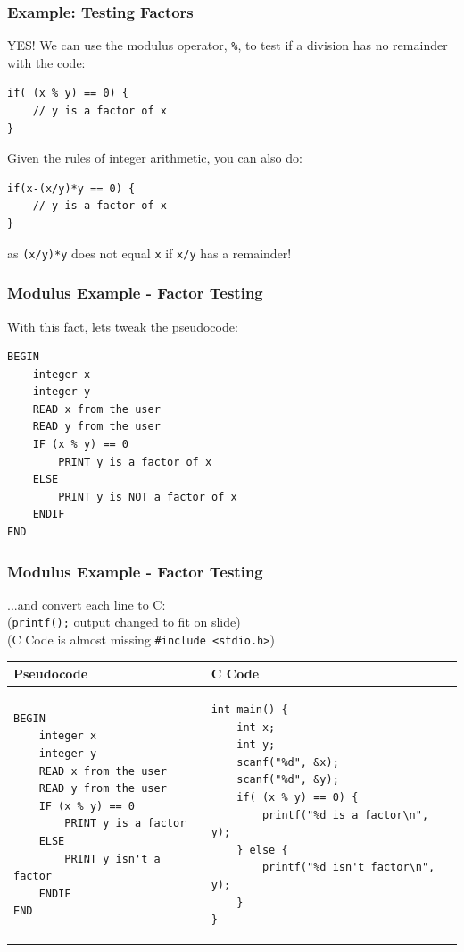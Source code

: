 \documentclass[14pt]{beamer}
\begin{document}
\begin{frame}[fragile]
\frametitle{Example: Testing Factors}
YES! We can use the modulus operator, \texttt{\%}, to test if a division has no remainder with the code:

\begin{lstlisting}[style=CStyle]
if( (x % y) == 0) {
	// y is a factor of x
}
\end{lstlisting}

Given the rules of integer arithmetic, you can also do:

\begin{lstlisting}[style=CStyle]
if(x-(x/y)*y == 0) {
	// y is a factor of x
}
\end{lstlisting}

as \texttt{(x/y)*y} does not equal \texttt{x} if \texttt{x/y} has a remainder!

\end{frame}

\begin{frame}[fragile]
\frametitle{Modulus Example - Factor Testing}
With this fact, lets tweak the pseudocode:
\begin{lstlisting}[style=pseudo]
BEGIN
	integer x
	integer y
	READ x from the user
	READ y from the user
	IF (x % y) == 0
		PRINT y is a factor of x
	ELSE
		PRINT y is NOT a factor of x
	ENDIF
END
\end{lstlisting}
\end{frame}

\begin{frame}[fragile]
\frametitle{Modulus Example - Factor Testing}
...and convert each line to C:\\
\vspace{4mm}
\small{(\texttt{printf();} output changed to fit on slide)}\\
\small{(C Code is almost missing \texttt{\#include <stdio.h>})}
\vspace{-2mm}
\begin{table}[H]
\centering

\begin{tabular}{ll}
Pseudocode & C Code \\
\hline

\begin{lstlisting}[style=pseudo,basicstyle=\ttfamily\scriptsize]
BEGIN
	integer x
	integer y
	READ x from the user
	READ y from the user
	IF (x % y) == 0
		PRINT y is a factor
	ELSE
		PRINT y isn't a factor
	ENDIF
END
\end{lstlisting} &

\begin{lstlisting}[style=Ctable,basicstyle=\ttfamily\scriptsize]
int main() {
	int x;
	int y;
	scanf("%d", &x);
	scanf("%d", &y);
	if( (x % y) == 0) {
		printf("%d is a factor\n", y);
	} else {
		printf("%d isn't factor\n", y);
	}
}
\end{lstlisting}
\\

\hline
\end{tabular}
\end{table}

\end{frame}
\end{document}
